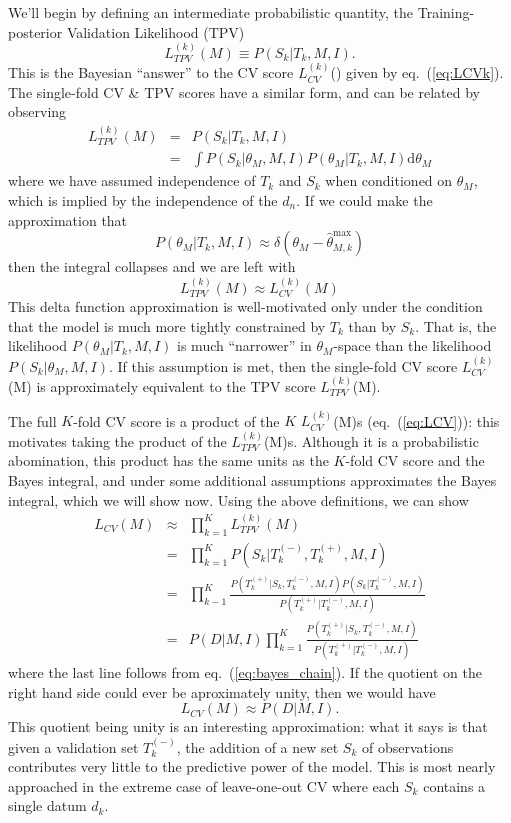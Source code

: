 \documentclass[12pt]{article}
\newcommand{\dd}{\mathrm{d}}
\newcommand{\thetamax}[1]{\ensuremath{\hat{\theta}^{\max}_{#1}}}
\newcommand{\LCV}[1]{\ensuremath{L_{CV}}(#1)}
\newcommand{\LCVk}[1]{\ensuremath{L^{(k)}_{CV}}(#1)}
\newcommand{\LTPVk}[1]{\ensuremath{L^{(k)}_{TPV}}(#1)}
\newcommand{\Tkplus}{\ensuremath{T_k^{(+)}}}
\newcommand{\Tkminus}{\ensuremath{T_k^{(-)}}}
\newcommand{\eqn}[1]{eq.~(\ref{eq:#1})}
\begin{document}
We'll begin by defining an intermediate probabilistic quantity, the
Training-posterior Validation Likelihood (TPV)
\begin{equation}
  \label{eq:LTPVk}
  \LTPVk{M} \equiv P(S_k|T_k, M, I).
\end{equation}
This is the Bayesian ``answer'' to the CV score \LCVk{} given by
\eqn{LCVk}.  The single-fold CV \& TPV scores have a similar form,
and can be related by observing
\begin{eqnarray}
  \LTPVk{M} &=& P(S_k|T_k,M,I)\\
            &=& \int P(S_k|\theta_M,M,I) P(\theta_M|T_k,M,I)\dd\theta_M
\end{eqnarray}
where we have assumed independence of $T_k$ and $S_k$ when conditioned on
$\theta_M$, which is implied by the independence of the  $d_n$.
If we could make the approximation that
\begin{equation}
  P(\theta_M|T_k,M,I) \approx \delta(\theta_M - \thetamax{M,k})
\end{equation}
then the integral collapses and we are left with
\begin{equation}
  \LTPVk{M} \approx \LCVk{M}
\end{equation}
This delta function approximation is well-motivated only under the condition
that the model is much more tightly constrained by $T_k$ than by $S_k$.
That is, the likelihood $P(\theta_M|T_k,M,I)$ is much ``narrower'' in
$\theta_M$-space than the likelihood $P(S_k|\theta_M,M,I)$.
If this assumption is met, then the single-fold CV score \LCVk{M} is
approximately equivalent to the TPV score \LTPVk{M}.

The full $K$-fold CV score is a product of the $K$ \LCVk{M}s (\eqn{LCV}):
this motivates taking the product of the \LTPVk{M}s.
Although it is a probabilistic abomination, this product has the same units
as the $K$-fold CV score and the Bayes integral, and under some additional
assumptions approximates the Bayes integral, which we will show now.
Using the above definitions, we can show
\begin{eqnarray}
  \LCV{M} &\approx& \prod_{k=1}^K \LTPVk{M} \\
          &=& \prod_{k=1}^K P(S_k|\Tkminus,\Tkplus,M,I)\\
          &=& \prod_{k-1}^K \frac{P(\Tkplus|S_k,\Tkminus,M,I) P(S_k|\Tkminus,M,I)}
                               {P(\Tkplus|\Tkminus,M,I)}\\
          &=& P(D|M,I) \prod_{k=1}^K \frac{P(\Tkplus|S_k,\Tkminus,M,I)}
                                        {P(\Tkplus|\Tkminus,M,I)}
\end{eqnarray}
where the last line follows from \eqn{bayes_chain}.
If the quotient on the right hand side could ever be
aproximately unity, then we would have
\begin{equation}
  \LCV{M} \approx P(D|M,I).
\end{equation}
This quotient being unity is an interesting approximation: what it says is that
given a validation set \Tkminus{}, the addition of a new set $S_k$ of
observations contributes very little to the predictive power of the model.
This is most nearly approached in the extreme case of leave-one-out CV
where each $S_k$ contains a single datum $d_k$.
\end{document}
